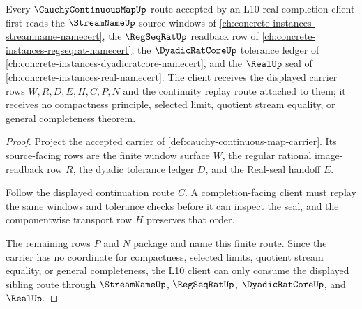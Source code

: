 \begin{theorem}
\label{thm:cauchy-continuous-map-l10-sibling-route}
Every $\CauchyContinuousMapUp$ route accepted by an L10 real-completion client first reads the $\StreamNameUp$ source windows of \autoref{ch:concrete-instances-streamname-namecert}, the $\RegSeqRatUp$ readback row of \autoref{ch:concrete-instances-regseqrat-namecert}, the $\DyadicRatCoreUp$ tolerance ledger of \autoref{ch:concrete-instances-dyadicratcore-namecert}, and the $\RealUp$ seal of \autoref{ch:concrete-instances-real-namecert}. The client receives the displayed carrier rows $W,R,D,E,H,C,P,N$ and the continuity replay route attached to them; it receives no compactness principle, selected limit, quotient stream equality, or general completeness theorem.
\end{theorem}
\begin{proof}
Project the accepted carrier of \autoref{def:cauchy-continuous-map-carrier}. Its source-facing rows are the finite window surface $W$, the regular rational image-readback row $R$, the dyadic tolerance ledger $D$, and the Real-seal handoff $E$.

Follow the displayed continuation route $C$. A completion-facing client must replay the same windows and tolerance checks before it can inspect the seal, and the componentwise transport row $H$ preserves that order.

The remaining rows $P$ and $N$ package and name this finite route. Since the carrier has no coordinate for compactness, selected limits, quotient stream equality, or general completeness, the L10 client can only consume the displayed sibling route through $\StreamNameUp$, $\RegSeqRatUp$, $\DyadicRatCoreUp$, and $\RealUp$.
\end{proof}
